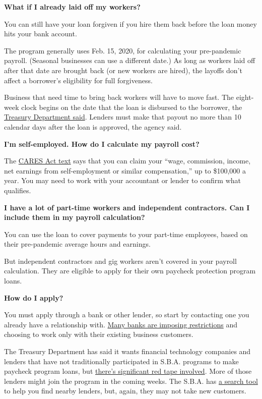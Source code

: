 \textbf{What if I already laid off my workers?}

You can still have your loan forgiven if you hire them back before the
loan money hits your bank account.

The program generally uses Feb. 15, 2020, for calculating your
pre-pandemic payroll. (Seasonal businesses can use a different date.) As
long as workers laid off after that date are brought back (or new
workers are hired), the layoffs don't affect a borrower's eligibility
for full forgiveness.

Business that need time to bring back workers will have to move fast.
The eight-week clock begins on the date that the loan is disbursed to
the borrower, the
\href{https://home.treasury.gov/system/files/136/Paycheck-Protection-Program-Frequenty-Asked-Questions.pdf}{Treasury
Department said}. Lenders must make that payout no more than 10 calendar
days after the loan is approved, the agency said.

\textbf{I'm self-employed. How do I calculate my payroll cost?}

The
\href{https://www.congress.gov/bill/116th-congress/house-bill/748/text}{CARES
Act text} says that you can claim your ``wage, commission, income, net
earnings from self-employment or similar compensation,'' up to \$100,000
a year. You may need to work with your accountant or lender to confirm
what qualifies.

\textbf{I have a lot of part-time workers and independent contractors.
Can I include them in my payroll calculation?}

You can use the loan to cover payments to your part-time employees,
based on their pre-pandemic average hours and earnings.

But independent contractors and gig workers aren't covered in your
payroll calculation. They are eligible to apply for their own paycheck
protection program loans.

\textbf{How do I apply?}

You must apply through a bank or other lender, so start by contacting
one you already have a relationship with.
\href{https://www.nytimes.com/2020/04/03/business/sba-loans-coronavirus.html}{Many
banks are imposing restrictions} and choosing to work only with their
existing business customers.

The Treasury Department has said it wants financial technology companies
and lenders that have not traditionally participated in S.B.A. programs
to make paycheck program loans, but
\href{https://www.nytimes.com/2020/04/09/technology/online-lenders-stimulus-virus.html}{there's
significant red tape involved}. More of those lenders might join the
program in the coming weeks. The S.B.A. has
\href{https://www.sba.gov/paycheckprotection/find}{a search tool} to
help you find nearby lenders, but, again, they may not take new
customers.

